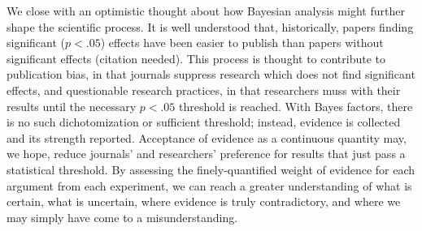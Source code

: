 \documentclass[fignum,nobf,man]{apa}
\begin{document}
We close with an optimistic thought about how Bayesian analysis might further shape the scientific process. It is well understood that, historically, papers finding significant ($p < .05$) effects have been easier to publish than papers without significant effects (citation needed). This process is thought to contribute to publication bias, in that journals suppress research which does not find significant effects, and questionable research practices, in that researchers muss with their results until the necessary $p < .05$ threshold is reached. %
With Bayes factors, there is no such dichotomization or sufficient threshold; instead, evidence is collected and its strength reported. Acceptance of evidence as a continuous quantity may, we hope, reduce journals' and researchers' preference for results that just pass a statistical threshold. By assessing the finely-quantified weight of evidence for each argument from each experiment, we can reach a greater understanding of what is certain, what is uncertain, where evidence is truly contradictory, and where we may simply have come to a misunderstanding.

\end{document}
